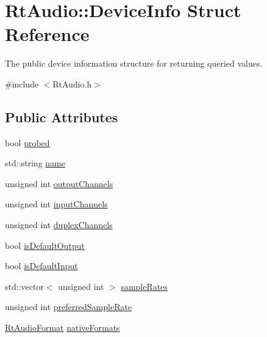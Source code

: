 \hypertarget{struct_rt_audio_1_1_device_info}{}\section{Rt\+Audio\+:\+:Device\+Info Struct Reference}
\label{struct_rt_audio_1_1_device_info}


The public device information structure for returning queried values.  




{\ttfamily \#include $<$Rt\+Audio.\+h$>$}

\subsection*{Public Attributes}
\begin{DoxyCompactItemize}
\item 
bool \hyperlink{struct_rt_audio_1_1_device_info_a97573717ccb1e75a834a0a108cd6982d}{probed}
\item 
std\+::string \hyperlink{struct_rt_audio_1_1_device_info_a24df596ab8d54f2eb540c7cf16212b3b}{name}
\item 
unsigned int \hyperlink{struct_rt_audio_1_1_device_info_a81aaf488f8158ef55b1bb678f66feb7d}{output\+Channels}
\item 
unsigned int \hyperlink{struct_rt_audio_1_1_device_info_a56247b458a937ae84d98ca9c4b243275}{input\+Channels}
\item 
unsigned int \hyperlink{struct_rt_audio_1_1_device_info_a3e8ad34c2d14e24293a0beafc26186e7}{duplex\+Channels}
\item 
bool \hyperlink{struct_rt_audio_1_1_device_info_a5365245e73ffe29a05734de4474acd58}{is\+Default\+Output}
\item 
bool \hyperlink{struct_rt_audio_1_1_device_info_a7c8aca084bd908799b6be5954b80def2}{is\+Default\+Input}
\item 
std\+::vector$<$ unsigned int $>$ \hyperlink{struct_rt_audio_1_1_device_info_afa65f5f92f66ce7aacd3ff35e11b230f}{sample\+Rates}
\item 
unsigned int \hyperlink{struct_rt_audio_1_1_device_info_ae9f35de296b33ae1f4e7baab8fd3be6e}{preferred\+Sample\+Rate}
\item 
\hyperlink{_rt_audio_8h_aafca92882d25915560018873221e44b8}{Rt\+Audio\+Format} \hyperlink{struct_rt_audio_1_1_device_info_a23251b549b89b2fe04a57fcd7cb76ea4}{native\+Formats}
\end{DoxyCompactItemize}


